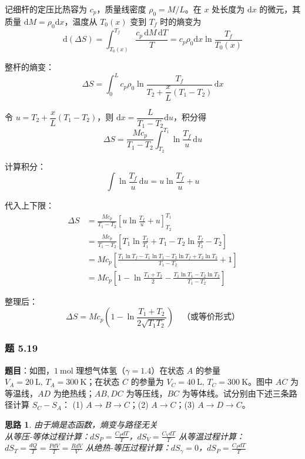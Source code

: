 \documentclass[UTF8]{ctexart}
\newtheorem{thoughts}{思路}[subsection]
\begin{document}
记细杆的定压比热容为 $c_p$，质量线密度 $\rho_0=M/L$。在 $x$ 处长度为 $\mathrm{d}x$ 的微元，其质量 $\mathrm{d}M=\rho_0\mathrm{d}x$，温度从 $T_0(x)$ 变到 $T_f$ 时的熵变为
\[
\mathrm{d}(\Delta S)=\int_{T_0(x)}^{T_f}\frac{c_p\,\mathrm{d}M\,\mathrm{d}T}{T}
=c_p\rho_0\mathrm{d}x\ln\frac{T_f}{T_0(x)}
\]

整杆的熵变：
\[
\Delta S=\int_0^L c_p\rho_0\ln\frac{T_f}{T_2+\dfrac{x}{L}(T_1-T_2)}\,\mathrm{d}x
\]

令 $u=T_2+\dfrac{x}{L}(T_1-T_2)$，则 $\mathrm{d}x=\dfrac{L}{T_1-T_2}\mathrm{d}u$，积分得
\[
\Delta S=\frac{Mc_p}{T_1-T_2}\int_{T_2}^{T_1}\ln\frac{T_f}{u}\,\mathrm{d}u
\]

计算积分：
\[
\int\ln\frac{T_f}{u}\,\mathrm{d}u
=u\ln\frac{T_f}{u}+u
\]

代入上下限：
\begin{align*}
\Delta S&=\frac{Mc_p}{T_1-T_2}
\left[u\ln\frac{T_f}{u}+u\right]_{T_2}^{T_1}\\[4pt]
&=\frac{Mc_p}{T_1-T_2}\left[
T_1\ln\frac{T_f}{T_1}+T_1-T_2\ln\frac{T_f}{T_2}-T_2\right]\\[4pt]
&=Mc_p\left[
\frac{T_1\ln T_f-T_1\ln T_1-T_2\ln T_f+T_2\ln T_2}{T_1-T_2}+1\right]\\[4pt]
&=Mc_p\left[1-\ln\frac{T_1+T_2}{2}
-\frac{T_1\ln T_1-T_2\ln T_2}{T_1-T_2}\right]
\end{align*}

整理后：
\[
\boxed{\Delta S=Mc_p\left(1-\ln\frac{T_1+T_2}{2\sqrt{T_1T_2}}\right)}
\quad\text{（或等价形式）}
\]

\subsubsection{题 5.19}

\textbf{题目}：如图，$1\ \mathrm{mol}$ 理想气体氢（$\gamma=1.4$）在状态 $A$ 的参量 $V_A=20\ \mathrm{L},\,T_A=300\ \mathrm{K}$；在状态 $C$ 的参量为 $V_C=40\ \mathrm{L},\,T_C=300\ \mathrm{K}$。图中 $AC$ 为等温线，$AD$ 为绝热线；$AB,DC$ 为等压线，$BC$ 为等体线。试分别由下述三条路径计算 $S_C-S_A$：
(1) $A\to B\to C$；(2) $A\to C$；(3) $A\to D\to C$。

\begin{thoughts}
  由于熵是态函数，熵变与路径无关\\
  从等压-等体过程计算：$dS_P = \frac{C_PdT}{T}$，$dS_V = \frac{C_VdT}{T}$
  从等温过程计算：$dS_T = \frac{dQ}{T} = \frac{PdV}{T} = \frac{RdV}{V}$
  从绝热-等压过程计算：$dS_\gamma = 0$，$dS_P = \frac{C_PdT}{T}$
\end{thoughts}
\end{document}
